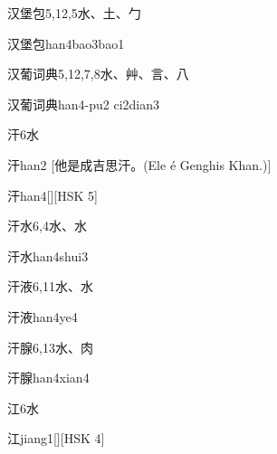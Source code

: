 \begin{entry}{汉堡包}{5,12,5}{⽔、⼟、⼓}
  \begin{phonetics}{汉堡包}{han4bao3bao1}
  \end{phonetics}
\end{entry}

\begin{entry}{汉葡词典}{5,12,7,8}{⽔、⾋、⾔、⼋}
  \begin{phonetics}{汉葡词典}{han4-pu2 ci2dian3}
  \end{phonetics}
\end{entry}

\begin{entry}{汗}{6}{⽔}
  \begin{phonetics}{汗}{han2}
    [他是成吉思汗。(Ele é Genghis Khan.)]
  \end{phonetics}
  \begin{phonetics}{汗}{han4}[][HSK 5]
  \end{phonetics}
\end{entry}

\begin{entry}{汗水}{6,4}{⽔、⽔}
  \begin{phonetics}{汗水}{han4shui3}
  \end{phonetics}
\end{entry}

\begin{entry}{汗液}{6,11}{⽔、⽔}
  \begin{phonetics}{汗液}{han4ye4}
  \end{phonetics}
\end{entry}

\begin{entry}{汗腺}{6,13}{⽔、⾁}
  \begin{phonetics}{汗腺}{han4xian4}
  \end{phonetics}
\end{entry}

\begin{entry}{江}{6}{⽔}
  \begin{phonetics}{江}{jiang1}[][HSK 4]
  \end{phonetics}
\end{entry}

